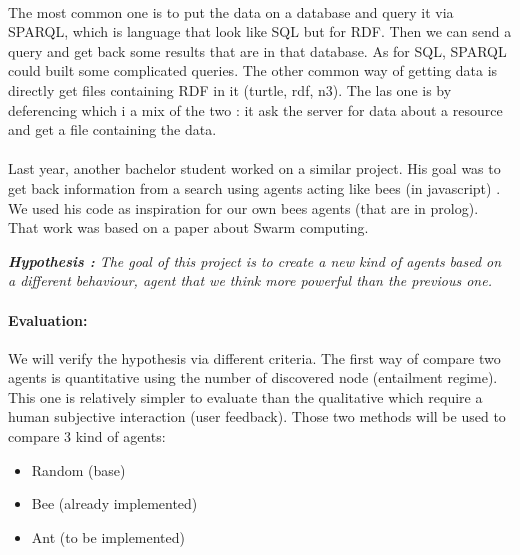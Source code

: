 \documentclass{article}
\newenvironment{itemh}[0]{\begin{itemize}[label=$\heartsuit$, font=\color{mygray} \small]}{\end{itemize}}
\begin{document}
	\paragraph{}	%
		The most common one is to put the data on a database and query it via SPARQL,
		which is language that look like SQL but for RDF.
		Then we can send a query and get back some results that are in that database.
		As for SQL, SPARQL could built some complicated queries.
		The other common way of getting data is directly get files containing RDF in it (turtle, rdf, n3).
		The las one is by deferencing which i a mix of the two :
		it ask the server for data about a resource and get a file containing the data.
	\paragraph{}	%
		Last year, another bachelor student worked on a similar project.
		His goal was to get back information from a search using agents acting like bees (in javascript) \cite{Kroes13}.
		We used his code as inspiration for our own bees agents (that are in prolog).
		That work was based on a paper \cite{Gueret10} about Swarm computing.
		\begin{center}
			\textit{
			\textbf{Hypothesis :} The goal of this project is to create a new kind of agents based on a different behaviour,
			agent that we think more powerful than the previous one.}
		\end{center}

		\paragraph{Evaluation:}
			We will verify the hypothesis via different criteria.
			The first way of compare two agents is quantitative using the number of discovered node (entailment regime).
			This one is relatively simpler to evaluate than the qualitative which require a human subjective interaction (user feedback).
			Those two methods will be used to compare 3 kind of agents:
		\begin{itemh}
			\item Random (base)
			\item Bee (already implemented)
			\item Ant (to be implemented)
		\end{itemh}
\end{document}
